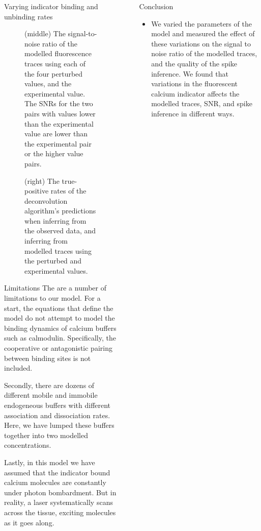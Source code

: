 \documentclass[final]{beamer}
\newlength{\sepwid}
\newlength{\onecolwid}
\begin{document}
\begin{frame}[t]
\begin{columns}[t]
\begin{column}{\onecolwid}
\begin{block}{Varying indicator binding and unbinding rates}
\begin{figure}
{	(middle) The signal-to-noise ratio of the modelled fluorescence traces using each of the four perturbed values, and the experimental value. The SNRs for the two pairs with values lower than the experimental value are lower than the experimental pair or the higher value pairs.

	(right) The true-positive rates of the deconvolution algorithm's predictions when inferring from the observed data, and inferring from modelled traces using the perturbed and experimental values.}
\end{figure}

\end{block}

\begin{block}{Limitations}
The are a number of limitations to our model. For a start, the equations that define the model do not attempt to model the binding dynamics of calcium buffers such as calmodulin. Specifically, the cooperative or antagonistic pairing between binding sites is not included.

\hspace{2cm} Secondly, there are dozens of different mobile and immobile endogeneous buffers with different association and dissociation rates. Here, we have lumped these buffers together into two modelled concentrations.

\hspace{2cm} Lastly, in this model we have assumed that the indicator bound calcium molecules are constantly under photon bombardment. But in reality, a laser systematically scans across the tissue, exciting molecules as it goes along.

\end{block}

\end{column} %

\begin{column}{\sepwid}\end{column} %

\begin{column}{\onecolwid} %


\begin{block}{Conclusion}
\begin{itemize}
 	\item We varied the parameters of the model and measured the effect of these variations on the signal to noise ratio of the modelled traces, and the quality of the spike inference. We found that variations in the fluorescent calcium indicator affects the modelled traces, SNR, and spike inference in different ways.


\end{itemize}
\end{block}
\end{column}
\end{columns}
\end{frame}
\end{document}
